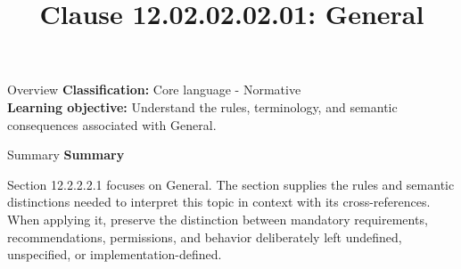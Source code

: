 \documentclass[10pt,letterpaper]{article}
\title{Clause 12.02.02.02.01: General}
\author{}
\date{}
\begin{document}
\maketitle
\begin{CornellOverviewBox}{Overview}
\textbf{Classification:} Core language - Normative\\[2pt]
\textbf{Learning objective:} Understand the rules, terminology, and semantic consequences associated with General.
\end{CornellOverviewBox}\begin{CornellSummaryBox}{Summary}
{\sffamily\bfseries\color{Accent} Summary}\par\vspace{3pt}Section 12.2.2.2.1 focuses on General. The section supplies the rules and semantic distinctions needed to interpret this topic in context with its cross-references. When applying it, preserve the distinction between mandatory requirements, recommendations, permissions, and behavior deliberately left undefined, unspecified, or implementation-defined.
\end{CornellSummaryBox}
\end{document}
